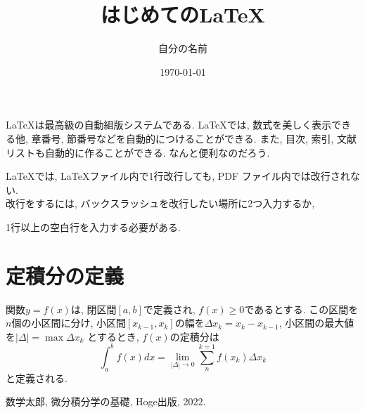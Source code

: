 \documentclass[a4j]{jarticle}
\title{はじめての\LaTeX}
\date{\today}
\author{自分の名前}
\begin{document}
  \maketitle
  
  \LaTeX は最高級の自動組版システムである.
  \LaTeX では, 数式を美しく表示できる他, 章番号, 節番号などを自動的につけることができる.
  また, 目次, 索引, 文献リストも自動的に作ることができる.
  なんと便利なのだろう.

  \LaTeX では, \LaTeX ファイル内で1行改行しても, PDF ファイル内では改行されない.\\
  改行をするには, バックスラッシュを改行したい場所に2つ入力するか,

  1行以上の空白行を入力する必要がある.

  \section{定積分の定義}
  関数$y=f(x)$は, 閉区間$[a, b]$で定義され, $f(x)\ge0$であるとする.
  この区間を$n$個の小区間に分け, 小区間$[x_{k-1}, x_k]$の幅を$\Delta x_k = x_k - x_{k-1}$, 小区間の最大値を$|\Delta| = \max{\Delta x_k}$ とするとき, $f(x)$の定積分は
  \[
    \int_a^b f(x)dx = \lim_{|\Delta| \to 0} \sum_{n}^{k=1}f(x_k)\Delta x_k
  \]  
  と定義される\cite{math2022}.

  \begin{thebibliography}{99}
    数学太郎, 微分積分学の基礎, Hoge出版, 2022.
  \end{thebibliography}
\end{document}
